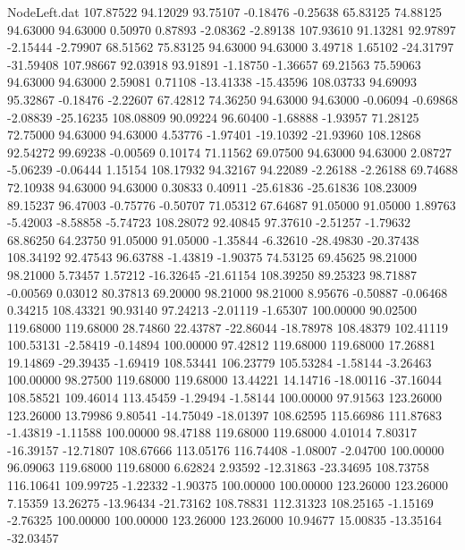 \begin{filecontents}{NodeLeft.dat}
 107.87522   94.12029   93.75107    -0.18476   -0.25638   65.83125   74.88125   94.63000   94.63000    0.50970    0.87893   -2.08362   -2.89138
 107.93610   91.13281   92.97897    -2.15444   -2.79907   68.51562   75.83125   94.63000   94.63000    3.49718    1.65102  -24.31797  -31.59408
 107.98667   92.03918   93.91891    -1.18750   -1.36657   69.21563   75.59063   94.63000   94.63000    2.59081    0.71108  -13.41338  -15.43596
 108.03733   94.69093   95.32867    -0.18476   -2.22607   67.42812   74.36250   94.63000   94.63000   -0.06094   -0.69868   -2.08839  -25.16235
 108.08809   90.09224   96.60400    -1.68888   -1.93957   71.28125   72.75000   94.63000   94.63000    4.53776   -1.97401  -19.10392  -21.93960
 108.12868   92.54272   99.69238    -0.00569    0.10174   71.11562   69.07500   94.63000   94.63000    2.08727   -5.06239   -0.06444    1.15154
 108.17932   94.32167   94.22089    -2.26188   -2.26188   69.74688   72.10938   94.63000   94.63000    0.30833    0.40911  -25.61836  -25.61836
 108.23009   89.15237   96.47003    -0.75776   -0.50707   71.05312   67.64687   91.05000   91.05000    1.89763   -5.42003   -8.58858   -5.74723
 108.28072   92.40845   97.37610    -2.51257   -1.79632   68.86250   64.23750   91.05000   91.05000   -1.35844   -6.32610  -28.49830  -20.37438
 108.34192   92.47543   96.63788    -1.43819   -1.90375   74.53125   69.45625   98.21000   98.21000    5.73457    1.57212  -16.32645  -21.61154
 108.39250   89.25323   98.71887    -0.00569    0.03012   80.37813   69.20000   98.21000   98.21000    8.95676   -0.50887   -0.06468    0.34215
 108.43321   90.93140   97.24213    -2.01119   -1.65307  100.00000   90.02500  119.68000  119.68000   28.74860   22.43787  -22.86044  -18.78978
 108.48379  102.41119  100.53131    -2.58419   -0.14894  100.00000   97.42812  119.68000  119.68000   17.26881   19.14869  -29.39435   -1.69419
 108.53441  106.23779  105.53284    -1.58144   -3.26463  100.00000   98.27500  119.68000  119.68000   13.44221   14.14716  -18.00116  -37.16044
 108.58521  109.46014  113.45459    -1.29494   -1.58144  100.00000   97.91563  123.26000  123.26000   13.79986    9.80541  -14.75049  -18.01397
 108.62595  115.66986  111.87683    -1.43819   -1.11588  100.00000   98.47188  119.68000  119.68000    4.01014    7.80317  -16.39157  -12.71807
 108.67666  113.05176  116.74408    -1.08007   -2.04700  100.00000   96.09063  119.68000  119.68000    6.62824    2.93592  -12.31863  -23.34695
 108.73758  116.10641  109.99725    -1.22332   -1.90375  100.00000  100.00000  123.26000  123.26000    7.15359   13.26275  -13.96434  -21.73162
 108.78831  112.31323  108.25165    -1.15169   -2.76325  100.00000  100.00000  123.26000  123.26000   10.94677   15.00835  -13.35164  -32.03457

\end{filecontents}

